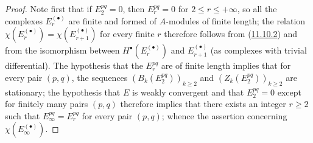 \begin{proof}
Note first that if $E_2^{pq}=0$, then $E_r^{pq}=0$ for
$2\leq r\leq+\infty$, so all the complexes $E_r^{(\bullet)}$ are finite and
formed of $A$-modules of finite length; the relation
$\chi(E_r^{(\bullet)})=\chi(E_{r+1}^{(\bullet)})$ for every finite $r$ therefore
follows from (\hyperref[0.11.10.2]{11.10.2}) and from the isomorphism
between $H^\bullet(E_r^{(\bullet)})$ and $E_{r+1}^{(\bullet)}$ (as complexes with
trivial differential). The hypothesis that the $E_r^{pq}$ are of finite length
implies that for every pair $(p,q)$, the sequences
$(B_k(E_2^{pq}))_{k\geq2}$ and $(Z_k(E_2^{pq}))_{k\geq2}$ are stationary;
the hypothesis that $E$ is weakly convergent and that $E_2^{pq}=0$ except
for finitely many pairs $(p,q)$ therefore implies that there exists an
integer $r\geq2$ such that $E_\infty^{pq}=E_r^{pq}$ for every pair $(p,q)$;
whence the assertion concerning $\chi(E_\infty^{(\bullet)})$.
\end{proof}


